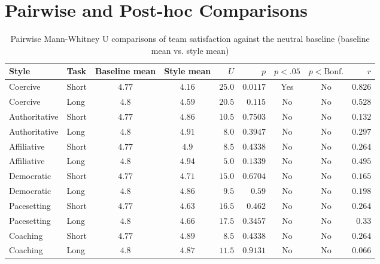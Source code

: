 \clearpage
\section{Pairwise and Post-hoc Comparisons}

\begin{table}[htbp]
  \centering
  \small
  \setlength{\tabcolsep}{2pt}
  \caption{Pairwise Mann-Whitney U comparisons of team satisfaction against the neutral baseline (baseline mean vs. style mean)}
  \label{tab:03-satisfaction-pairwise}
\begin{tabular}{l l c c r r c c r}
    \toprule
    Style & Task & Baseline mean & Style mean & $U$ & $p$ & $p < .05$ & $p < \text{Bonf.}$ & $r$ \\
    \midrule
    Coercive & Short & $4.77$ & $4.16$ & $25.0$ & $0.0117$ & Yes & No & $0.826$ \\
    Coercive & Long & $4.8$ & $4.59$ & $20.5$ & $0.115$ & No & No & $0.528$ \\
    Authoritative & Short & $4.77$ & $4.86$ & $10.5$ & $0.7503$ & No & No & $0.132$ \\
    Authoritative & Long & $4.8$ & $4.91$ & $8.0$ & $0.3947$ & No & No & $0.297$ \\
    Affiliative & Short & $4.77$ & $4.9$ & $8.5$ & $0.4338$ & No & No & $0.264$ \\
    Affiliative & Long & $4.8$ & $4.94$ & $5.0$ & $0.1339$ & No & No & $0.495$ \\
    Democratic & Short & $4.77$ & $4.71$ & $15.0$ & $0.6704$ & No & No & $0.165$ \\
    Democratic & Long & $4.8$ & $4.86$ & $9.5$ & $0.59$ & No & No & $0.198$ \\
    Pacesetting & Short & $4.77$ & $4.63$ & $16.5$ & $0.462$ & No & No & $0.264$ \\
    Pacesetting & Long & $4.8$ & $4.66$ & $17.5$ & $0.3457$ & No & No & $0.33$ \\
    Coaching & Short & $4.77$ & $4.89$ & $8.5$ & $0.4338$ & No & No & $0.264$ \\
    Coaching & Long & $4.8$ & $4.87$ & $11.5$ & $0.9131$ & No & No & $0.066$ \\
    \bottomrule
\end{tabular}%
\end{table}

